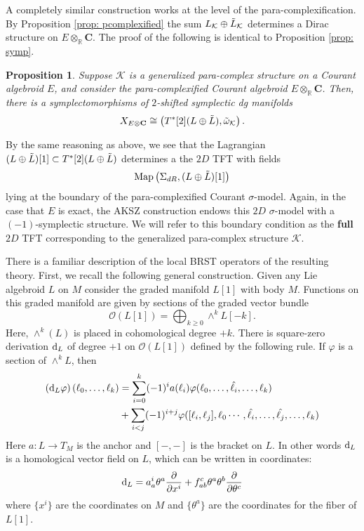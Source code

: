 \documentclass{article}
\newcommand{\KK}{\mathcal{K}}
\newcommand{\Cc}{\mathbf{C}}
\newcommand{\RR}{\mathbb{R}}
\newcommand{\cO}{\mathcal{O}}
\def\d{{\rm d}}
\newtheorem{proposition}[theorem]{Proposition}
\theoremstyle{definition}
\theoremstyle{remark}
\begin{document}
A completely similar construction works at the level of the para-complexification. 
By Proposition \ref{prop: pcomplexified} the sum $L_\KK \oplus \Tilde{L}_{\KK}$ determines a Dirac structure on $E \otimes_\RR \Cc$. 
The proof of the following is identical to Proposition \ref{prop: symp}. 

\begin{proposition}\label{prop: complexifiedsymp}
Suppose $\KK$ is a generalized para-complex structure on a Courant algebroid $E$, and consider the para-complexified Courant algebroid $E \otimes_{\RR} \Cc$. 
Then, there is a symplectomorphisms of $2$-shifted symplectic dg manifolds
\[
X_{E\otimes \Cc} \cong \left(T^*[2] (L \oplus \Tilde{L}), \Tilde{\omega}_{\KK} \right) .
\]
\end{proposition}

By the same reasoning as above, we see that the Lagrangian $(L \oplus \Tilde{L})[1] \subset T^*[2] (L \oplus \Tilde{L})$ determines a the $2D$ TFT with fields
\[
{\rm Map} \left(\Sigma_{dR}, (L \oplus \Tilde{L})[1]\right)
\]
lying at the boundary of the para-complexified Courant $\sigma$-model. 
Again, in the case that $E$ is exact, the AKSZ construction endows this $2D$ $\sigma$-model with a $(-1)$-symplectic structure. 
We will refer to this boundary condition as the {\bf full} $2D$ TFT corresponding to the generalized para-complex structure $\KK$. 

There is a familiar description of the local BRST operators of the resulting theory.
First, we recall the following general construction.
Given any Lie algebroid $L$ on $M$ consider the graded manifold $L[1]$ with body $M$. 
Functions on this graded manifold are given by sections of the graded vector bundle
\[
\cO(L[1]) = \bigoplus_{k \geq 0} \wedge^k L [-k] .
\]
Here, $\wedge^k(L)$ is placed in cohomological degree $+k$. 
There is square-zero derivation $\d_L$ of degree $+1$ on $\cO(L[1])$ defined by the following rule. 
If $\varphi$ is a section of $\wedge^k L$, then
\begin{align*}
\left( \d_L \varphi \right) (\ell_0, \ldots, \ell_k) & = \sum_{i = 0}^k (-1)^i a (\ell_i) \varphi(\ell_0, \ldots, \Hat{\ell_i}, \ldots, \ell_k) \\ & + \sum_{i < j} (-1)^{i+j} \varphi([\ell_i, \ell_j] , \ell_0 \cdots, \Hat{\ell_i}, \ldots, \Hat{\ell_j}, \ldots, \ell_k)
\end{align*}
Here $a : L \to T_M$ is the anchor and $[-,-]$ is the bracket on $L$. 
In other words $\d_L$ is a homological vector field on $L$, which can be written in coordinates:
\[
\d_L = a_a^i \theta^a \frac{\partial}{\partial x^i} + f_{ab}^c \theta^a \theta^b \frac{\partial}{\partial \theta^c}
\]
where $\{x^i\}$ are the coordinates on $M$ and $\{\theta^a\}$ are the coordinates for the fiber of $L[1]$.
\end{document}
